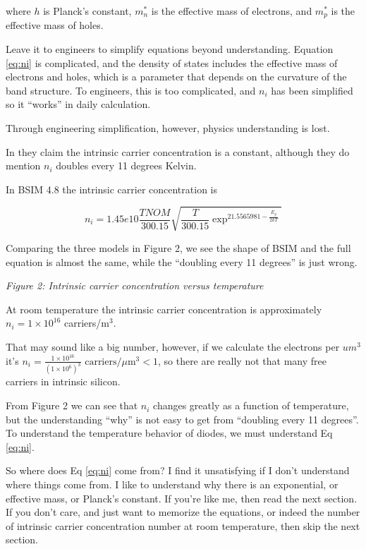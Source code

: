 where \(h\) is Planck's constant, \(m_n^\ast\) is the effective mass of
electrons, and \(m_p^\ast\) is the effective mass of holes.

Leave it to engineers to simplify equations beyond understanding.
Equation \eqref{eq:ni} is complicated, and the density of states
includes the effective mass of electrons and holes, which is a parameter
that depends on the curvature of the band structure. To engineers, this
is too complicated, and \(n_i\) has been simplified so it ``works'' in
daily calculation.

Through engineering simplification, however, physics understanding is
lost.

In  they claim the intrinsic carrier
concentration is a constant, although they do mention \(n_i\) doubles
every 11 degrees Kelvin.

In BSIM 4.8  the intrinsic carrier
concentration is

\[ n_{i} = 1.45e10 \frac{TNOM}{300.15} \sqrt{\frac{T}{300.15} \exp^{21.5565981
- \frac{E_g}{2kT}}} \]

Comparing the three models in Figure 2, we see the shape of BSIM and the
full equation is almost the same, while the ``doubling every 11
degrees'' is just wrong.


{
\centering
{}
}

\emph{Figure 2: Intrinsic carrier concentration versus temperature}

At room temperature the intrinsic carrier concentration is approximately
\(n_{i} =  1 \times 10^{16}\) carriers/m\(^3\).

That may sound like a big number, however, if we calculate the electrons
per \(um^{3}\) it's
\(n_{i} = \frac{1 \times 10^{16}}{(1 \times 10^{6})^{3}} \text{ carriers}/\mu \text{m}^{3}< 1\),
so there are really not that many free carriers in intrinsic silicon.

From Figure 2 we can see that \(n_i\) changes greatly as a function of
temperature, but the understanding ``why'' is not easy to get from
``doubling every 11 degrees''. To understand the temperature behavior of
diodes, we must understand Eq \eqref{eq:ni}.

So where does Eq \eqref{eq:ni} come from? I find it unsatisfying if I
don't understand where things come from. I like to understand why there
is an exponential, or effective mass, or Planck's constant. If you're
like me, then read the next section. If you don't care, and just want to
memorize the equations, or indeed the number of intrinsic carrier
concentration number at room temperature, then skip the next section.

